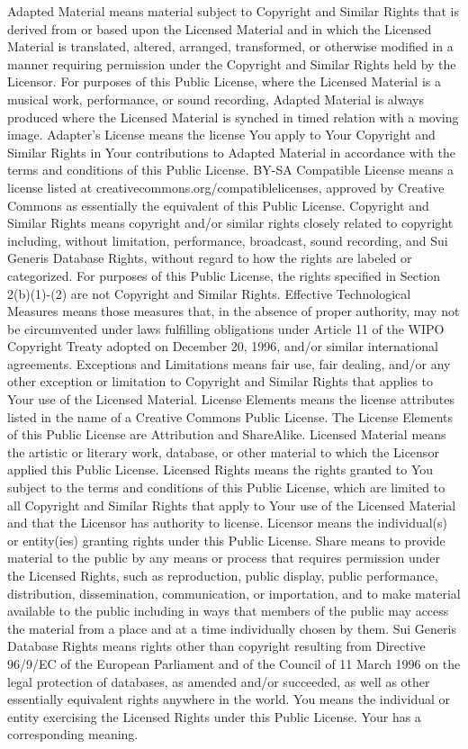     Adapted Material means material subject to Copyright and Similar Rights that is derived from or based upon the Licensed Material and in which the Licensed Material is translated, altered, arranged, transformed, or otherwise modified in a manner requiring permission under the Copyright and Similar Rights held by the Licensor. For purposes of this Public License, where the Licensed Material is a musical work, performance, or sound recording, Adapted Material is always produced where the Licensed Material is synched in timed relation with a moving image.
    Adapter's License means the license You apply to Your Copyright and Similar Rights in Your contributions to Adapted Material in accordance with the terms and conditions of this Public License.
    BY-SA Compatible License means a license listed at creativecommons.org/compatiblelicenses, approved by Creative Commons as essentially the equivalent of this Public License.
    Copyright and Similar Rights means copyright and/or similar rights closely related to copyright including, without limitation, performance, broadcast, sound recording, and Sui Generis Database Rights, without regard to how the rights are labeled or categorized. For purposes of this Public License, the rights specified in Section 2(b)(1)-(2) are not Copyright and Similar Rights.
    Effective Technological Measures means those measures that, in the absence of proper authority, may not be circumvented under laws fulfilling obligations under Article 11 of the WIPO Copyright Treaty adopted on December 20, 1996, and/or similar international agreements.
    Exceptions and Limitations means fair use, fair dealing, and/or any other exception or limitation to Copyright and Similar Rights that applies to Your use of the Licensed Material.
    License Elements means the license attributes listed in the name of a Creative Commons Public License. The License Elements of this Public License are Attribution and ShareAlike.
    Licensed Material means the artistic or literary work, database, or other material to which the Licensor applied this Public License.
    Licensed Rights means the rights granted to You subject to the terms and conditions of this Public License, which are limited to all Copyright and Similar Rights that apply to Your use of the Licensed Material and that the Licensor has authority to license.
    Licensor means the individual(s) or entity(ies) granting rights under this Public License.
    Share means to provide material to the public by any means or process that requires permission under the Licensed Rights, such as reproduction, public display, public performance, distribution, dissemination, communication, or importation, and to make material available to the public including in ways that members of the public may access the material from a place and at a time individually chosen by them.
    Sui Generis Database Rights means rights other than copyright resulting from Directive 96/9/EC of the European Parliament and of the Council of 11 March 1996 on the legal protection of databases, as amended and/or succeeded, as well as other essentially equivalent rights anywhere in the world.
    You means the individual or entity exercising the Licensed Rights under this Public License. Your has a corresponding meaning.

